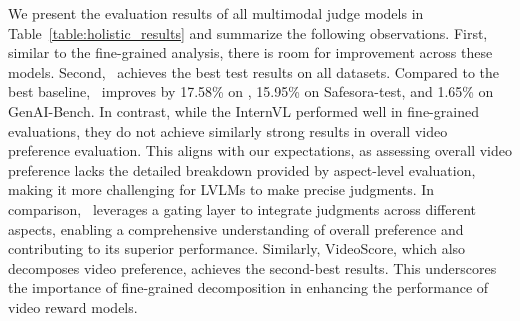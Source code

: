 We present the evaluation results of all multimodal judge models in Table~\ref{table:holistic_results} and summarize the following observations. First, similar to the fine-grained analysis, there is room for improvement across these models. Second, \algname\ achieves the best test results on all datasets. Compared to the best baseline, \algname\ improves by 17.58\% on \datasetname, 15.95\% on Safesora-test, and 1.65\% on GenAI-Bench. In contrast, while the InternVL performed well in fine-grained evaluations, they do not achieve similarly strong results in overall video preference evaluation. This aligns with our expectations, as assessing overall video preference lacks the detailed breakdown provided by aspect-level evaluation, making it more challenging for LVLMs to make precise judgments. In comparison, \algname\ leverages a gating layer to integrate judgments across different aspects, enabling a comprehensive understanding of overall preference and contributing to its superior performance. Similarly, VideoScore, which also decomposes video preference, achieves the second-best results. This underscores the importance of fine-grained decomposition in enhancing the performance of video reward models.













